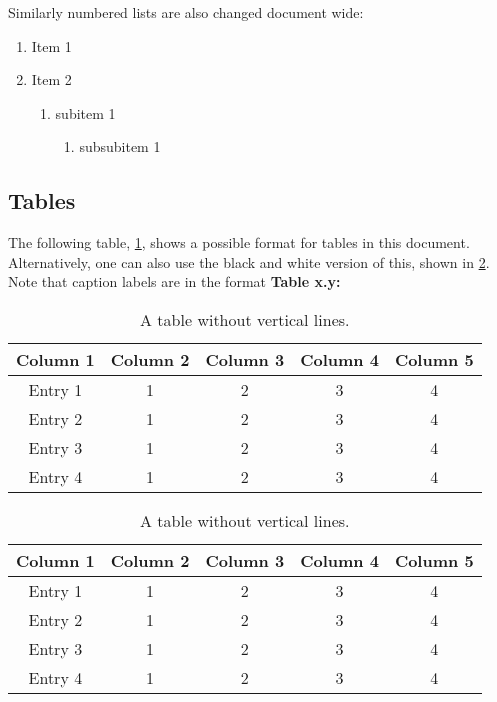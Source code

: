 Similarly numbered lists are also changed document wide:

\begin{enumerate}
    \item Item 1
    \item Item 2
    \begin{enumerate}
        \item subitem 1
        \begin{enumerate}
            \item subsubitem 1
        \end{enumerate}
    \end{enumerate}
\end{enumerate}


\subsection{Tables}
The following table, \cref{table: style 1}, shows a possible format for tables in this document. Alternatively, one can also use the black and white version of this, shown in \cref{table: style 2}. Note that caption labels are in the format \textbf{\textcolor{Tue-red}{Table x.y:} }

\begin{table}[ht]
    \centering
    \caption{A table without vertical lines.}
    \begin{tabular}[t]{ccccc}
        \toprule
        \color{Tue-red}\textbf{Column 1}&\color{Tue-red}\textbf{Column 2}&\color{Tue-red}\textbf{Column 3}&\color{Tue-red}\textbf{Column 4}&\color{Tue-red}\textbf{Column 5}\\
        \midrule
        Entry 1&1&2&3&4\\
        Entry 2&1&2&3&4\\
        Entry 3&1&2&3&4\\
        Entry 4&1&2&3&4\\
        \bottomrule
    \end{tabular}
    \label{table: style 1}
\end{table}

\begin{table}[ht]
    \centering
    \caption{A table without vertical lines.}
    \begin{tabular}[t]{ccccc}
        \toprule
        \textbf{Column 1}&\textbf{Column 2}&\textbf{Column 3}&\textbf{Column 4}&\textbf{Column 5}\\
        \midrule
        Entry 1&1&2&3&4\\
        Entry 2&1&2&3&4\\
        Entry 3&1&2&3&4\\
        Entry 4&1&2&3&4\\
        \bottomrule
    \end{tabular}
    \label{table: style 2}
\end{table}


